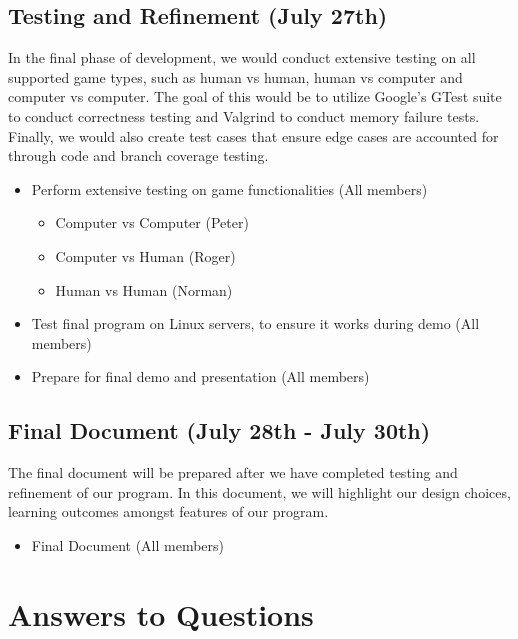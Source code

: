 \documentclass{article}
\begin{document}
\subsection*{Testing and Refinement (July 27th)}
In the final phase of development, we would conduct extensive testing on all supported game types, such as human vs human, human vs computer and 
computer vs computer. The goal of this would be to utilize Google's GTest suite to conduct correctness testing and Valgrind to conduct memory 
failure tests. Finally, we would also create test cases that ensure edge cases are accounted for through code and branch coverage testing.
\begin{itemize}
    \item Perform extensive testing on game functionalities (All members)
    \begin{itemize}
        \item Computer vs Computer (Peter)
        \item Computer vs Human (Roger)
        \item Human vs Human (Norman)
    \end{itemize}
    \item Test final program on Linux servers, to ensure it works during demo (All members)
    \item Prepare for final demo and presentation (All members)
\end{itemize}
\subsection*{Final Document (July 28th - July 30th)}
The final document will be prepared after we have completed testing and refinement of our program. In this document, we will highlight our 
design choices, learning outcomes amongst features of our program.  
\begin{itemize}
    \item Final Document (All members)
\end{itemize}

\pagebreak
\section*{Answers to Questions}
\end{document}
